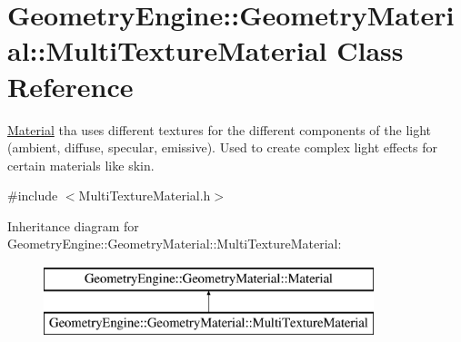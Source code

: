 \hypertarget{class_geometry_engine_1_1_geometry_material_1_1_multi_texture_material}{}\section{Geometry\+Engine\+::Geometry\+Material\+::Multi\+Texture\+Material Class Reference}
\label{class_geometry_engine_1_1_geometry_material_1_1_multi_texture_material}


\mbox{\hyperlink{class_geometry_engine_1_1_geometry_material_1_1_material}{Material}} tha uses different textures for the different components of the light (ambient, diffuse, specular, emissive). Used to create complex light effects for certain materials like skin.  




{\ttfamily \#include $<$Multi\+Texture\+Material.\+h$>$}

Inheritance diagram for Geometry\+Engine\+::Geometry\+Material\+::Multi\+Texture\+Material\+:\begin{figure}[H]
\begin{center}
\leavevmode
\includegraphics[height=2.000000cm]{class_geometry_engine_1_1_geometry_material_1_1_multi_texture_material}
\end{center}
\end{figure}
